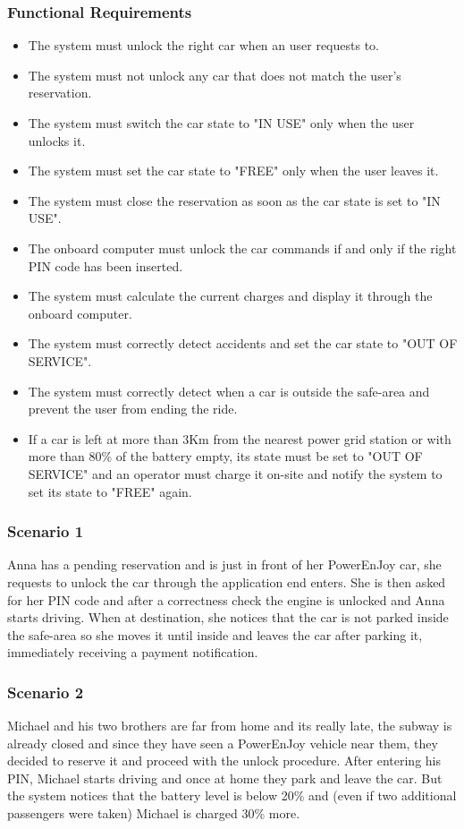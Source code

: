 \subsubsection{Functional Requirements}
\begin{itemize}
  \item The system must unlock the right car when an user requests to.
  \item The system must not unlock any car that does not match the user's reservation.
  \item The system must switch the car state to "IN USE" only when the user unlocks it.
  \item The system must set the car state to "FREE" only when the user leaves it.
  \item The system must close the reservation as soon as the car state is set to "IN USE".
  \item The onboard computer must unlock the car commands if and only if the right PIN code has been inserted.
  \item The system must calculate the current charges and display it through the onboard computer.
  \item The system must correctly detect accidents and set the car state to "OUT OF SERVICE".
  \item The system must correctly detect when a car is outside the safe-area and prevent the user from ending the ride.
  \item If a car is left at more than 3Km from the nearest power grid station or with more than 80\% of the battery empty, its state must be set to "OUT OF SERVICE" and an operator must charge it on-site and notify the system to set its state to "FREE" again.
\end{itemize}


\subsubsection{Scenario 1}
Anna has a pending reservation and is just in front of her PowerEnJoy car, she requests to unlock the car through the application end enters. She is then asked for her PIN code and after a correctness check the engine is unlocked and Anna starts driving. When at destination, she notices that the car is not parked inside the safe-area so she moves it until inside and leaves the car after parking it, immediately receiving a payment notification.


\subsubsection{Scenario 2}
Michael and his two brothers are far from home and its really late, the subway is already closed and since they have seen a PowerEnJoy vehicle near them, they decided to reserve it and proceed with the unlock procedure. After entering his PIN, Michael starts driving and once at home they park and leave the car. But the system notices that the battery level is below 20\% and (even if two additional passengers were taken) Michael is charged 30\% more.


